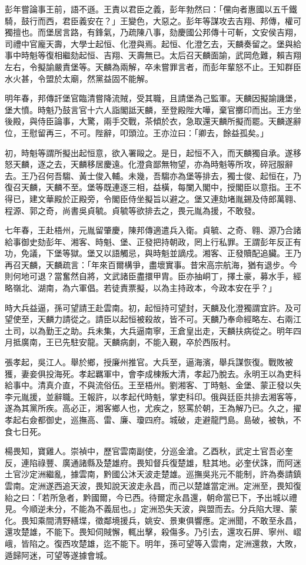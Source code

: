 \begin{pinyinscope}
彭年嘗論事王前，語不遜。王責以君臣之義，彭年勃然曰：「儻向者惠國以五千鐵騎，鼓行而西，君臣義安在？」王變色，大惡之。彭年等謀攻去吉翔、邦傳，權可獨擅也。而堡居言路，有鋒氣，乃疏陳八事，劾慶國公邦傳十可斬，文安侯吉翔，司禮中官龐天壽，大學士起恒、化澄與焉。起恒、化澄乞去，天麟奏留之。堡與給事中時魁等復相繼劾起恒、吉翔、天壽無已。太后召天麟面諭，武岡危難，賴吉翔左右，令擬諭嚴責堡等。天麟為兩解，卒未嘗罪言者，而彭年輩怒不止。王知群臣水火甚，令盟於太廟，然黨益固不能解。

明年春，邦傳訐堡官臨清嘗降流賊，受其職，且請堡為己監軍。天麟因擬諭譏堡，堡大憤。時魁乃鼓言官十六人詣閣詆天麟，至登殿陛大嘩，棄官擲印而出。王方坐後殿，與侍臣論事，大驚，兩手交戰，茶傾於衣，急取還天麟所擬而罷。天麟遂辭位，王慰留再三，不可。陛辭，叩頭泣。王亦泣曰：「卿去，餘益孤矣。」

初，時魁等謂所擬出起恒意，欲入署毆之。是日，起恒不入，而天麟獨自承。遂移怒天麟，逐之去，天麟移居慶遠。化澄貪鄙無物望，亦為時魁等所攻，碎冠服辭去。王乃召何吾騶、黃士俊入輔。未幾，吾騶亦為堡等排去，獨士俊、起恒在，乃復召天麟，天麟不至。堡等既連逐三相，益橫，每闌入閣中，授閣臣以意指。王不得已，建文華殿於正殿旁，令閣臣侍坐擬旨以避之。堡又連劾堵胤錫及侍郎萬翱、程源、郭之奇，尚書吳貞毓。貞毓等欲排去之，畏元胤為援，不敢發。

七年春，王赴梧州，元胤留肇慶，陳邦傳適遣兵入衛。貞毓、之奇、翱、源乃合諸給事御史劾彭年、湘客、時魁、堡、正發把持朝政，罔上行私罪。王謂彭年反正有功，免議，下堡等獄。堡又以語觸忌，與時魁並謫戍。湘客、正發贖配追臟。王乃再召天麟，天麟疏言：「年來百爾構爭，盡壞實事。昔宋高宗航海，猶有退步。今則何地可退？當奮然自將，文武諸臣盡擐甲胄。臣亦抽峒丁，擇土豪，募水手，經略嶺北、湖南，為六軍倡。若徒責票擬，以為主持政本，今政本安在乎？」

時大兵益逼，孫可望請王赴雲南。初，起恒持可望封，天麟及化澄獨謂宜許。及可望使至，天麟力請從之。請臣以起恒被殺故，皆不可。天麟乃奉命經略左、右兩江土司，以為勤王之助。兵未集，大兵逼南寧，王倉皇出走，天麟扶病從之。明年四月抵廣南，王已先駐安龍。天麟病劇，不能入覲，卒於西阪村。

張孝起，吳江人。舉於鄉，授廉州推官。大兵至，逼海濱，舉兵謀恢復。戰敗被獲，妻妾俱投海死。孝起羈軍中，會李成棟叛大清，孝起乃脫去。永明王以為吏科給事中。清真介直，不與流俗伍。王至梧州。劉湘客、丁時魁、金堡、蒙正發以失李元胤援，並辭職。王報許，以孝起代時魁，掌吏科印。俄與廷臣共排去湘客等，遂為其黨所疾。高必正，湘客鄉人也，尤疾之，怒罵於朝，王為解乃已。久之，擢孝起右僉都御史，巡撫高、雷、廉、瓊四府。城破，走避龍門島。島破，被執，不食七日死。

楊畏知，寶雞人。崇禎中，歷官雲南副使，分巡金滄。乙酉秋，武定土官吾必奎反，連陷祿豐、廣通諸縣及楚雄府。畏知督兵復楚雄，駐其地。必奎伏誅，而阿迷土官沙定洲繼亂，據雲南，黔國公沐天波走楚雄。巡撫吳兆元不能制，許為奏請鎮雲南。定洲遂西追天波，畏知說天波走永昌，而己以楚雄當定洲。定洲至，畏知復紿之曰：「若所急者，黔國爾，今已西。待爾定永昌還，朝命當已下，予出城以禮見。今順逆未分，不能為不義屈也。」定洲恐失天波，與盟而去。分兵陷大理、蒙化。畏知乘間清野繕堞，徵鄰境援兵，姚安、景東俱響應。定洲聞，不敢至永昌，還攻楚雄，不能下。畏知伺賊懈，輒出擊，殺傷多。乃引去，還攻石屏、寧州、嶍峨，皆陷之。復西攻楚雄，迄不能下。明年，孫可望等入雲南，定洲還救，大敗，遁歸阿迷，可望等遂據會城。


\end{pinyinscope}
